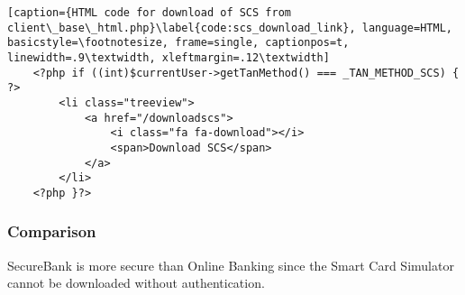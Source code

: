 \begin{lstlisting}[caption={HTML code for download of SCS from client\_base\_html.php}\label{code:scs_download_link}, language=HTML, basicstyle=\footnotesize, frame=single, captionpos=t, linewidth=.9\textwidth, xleftmargin=.12\textwidth]
    <?php if ((int)$currentUser->getTanMethod() === _TAN_METHOD_SCS) { ?>
        <li class="treeview">
            <a href="/downloadscs">
                <i class="fa fa-download"></i>
                <span>Download SCS</span>
            </a>
        </li>
    <?php }?>
\end{lstlisting}

\subsubsection{Comparison}
SecureBank is more secure than Online Banking since the Smart Card Simulator cannot be downloaded without authentication.
\clearpage